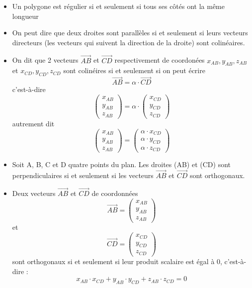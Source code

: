 \documentclass{exam}
\begin{document}
\begin{itemize}
  \item Un polygone est régulier si et seulement si tous ses côtés ont la même longueur
  \item On peut dire que deux droites sont parallèles si et seulement si leurs vecteurs directeurs (les vecteurs qui suivent la direction de la droite) sont colinéaires.
  \item On dit que 2 vecteurs $\overrightarrow{AB}$ et $\overrightarrow{CD}$ respectivement de coordonées $x_{AB}, y_{AB}, z_{AB}$ et $x_{CD}, y_{CD}, z_{CD}$ sont colinéires si et seulement si on peut écrire 
  \[
  \overrightarrow{AB} = \alpha \cdot \overrightarrow{CD}
  \]
 c'est-à-dire
  \[
  \begin{pmatrix}
    x_{AB} \\
    y_{AB} \\ 
    z_{AB}
  \end{pmatrix}
  = 
  \alpha \cdot
  \begin{pmatrix}
    x_{CD} \\
    y_{CD} \\ 
    z_{CD}
  \end{pmatrix}
\] 
autrement dit 
\[
  \begin{pmatrix}
    x_{AB} \\
    y_{AB} \\ 
    z_{AB}
  \end{pmatrix}
  =
  \begin{pmatrix}
    \alpha \cdot x_{CD} \\
    \alpha \cdot y_{CD} \\ 
    \alpha \cdot z_{CD}
  \end{pmatrix}
\] 
\item Soit A, B, C et D quatre points du plan. Les droites (AB) et (CD) sont perpendiculaires si et seulement si les vecteurs $\overrightarrow{AB}$ et $\overrightarrow{CD}$ sont orthogonaux.
\item Deux vecteurs $\overrightarrow{AB}$ et $\overrightarrow{CD}$ de coordonnées \\ 

\[
  \overrightarrow{AB} = 
  \begin{pmatrix}
    x_{AB} \\
    y_{AB} \\ 
    z_{AB}
  \end{pmatrix}
\] et
\[
  \overrightarrow{CD} = 
  \begin{pmatrix}
    x_{CD} \\
    y_{CD} \\ 
    z_{CD}
  \end{pmatrix}
\]
sont orthogonaux si et seulement si leur produit scalaire est égal à 0, c'est-à-dire : 
\[
  x_{AB} \cdot x_{CD} + y_{AB} \cdot y_{CD} + z_{AB} \cdot z_{CD} = 0
\]
\end{itemize}
\end{document}
